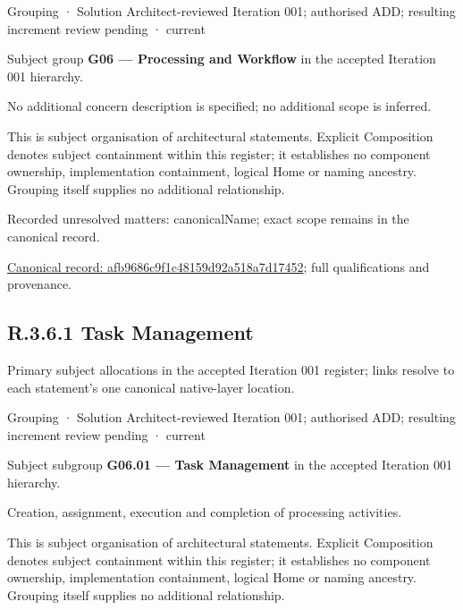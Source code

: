 \label{element:afb9686c9f1c48159d92a518a7d17452}
{\small Grouping · Solution Architect-reviewed Iteration 001; authorised ADD; resulting increment review pending · current}\par

Subject group \textbf{G06 — Processing and Workflow} in the accepted Iteration 001 hierarchy.



No additional concern description is specified; no additional scope is inferred.



This is subject organisation of architectural statements. Explicit Composition denotes subject containment within this register; it establishes no component ownership, implementation containment, logical Home or naming ancestry. Grouping itself supplies no additional relationship.


{\small Recorded unresolved matters: canonicalName; exact scope remains in the canonical record.}\par
{\footnotesize \href{../../../../continuum/grouping/afb9686c9f1c48159d92a518a7d17452.md}{Canonical record: afb9686c9f1c48159d92a518a7d17452}; full qualifications and provenance.}\par
\subsection*{R.3.6.1 Task Management}
\label{navigation:R.3.6.1}

Primary subject allocations in the accepted Iteration 001 register; links resolve to each statement’s one canonical native-layer location.\par
\label{element:0b6d5f58354040189b3a9a30a9b913d9}
{\small Grouping · Solution Architect-reviewed Iteration 001; authorised ADD; resulting increment review pending · current}\par

Subject subgroup \textbf{G06.01 — Task Management} in the accepted Iteration 001 hierarchy.



Creation, assignment, execution and completion of processing activities.



This is subject organisation of architectural statements. Explicit Composition denotes subject containment within this register; it establishes no component ownership, implementation containment, logical Home or naming ancestry. Grouping itself supplies no additional relationship.


